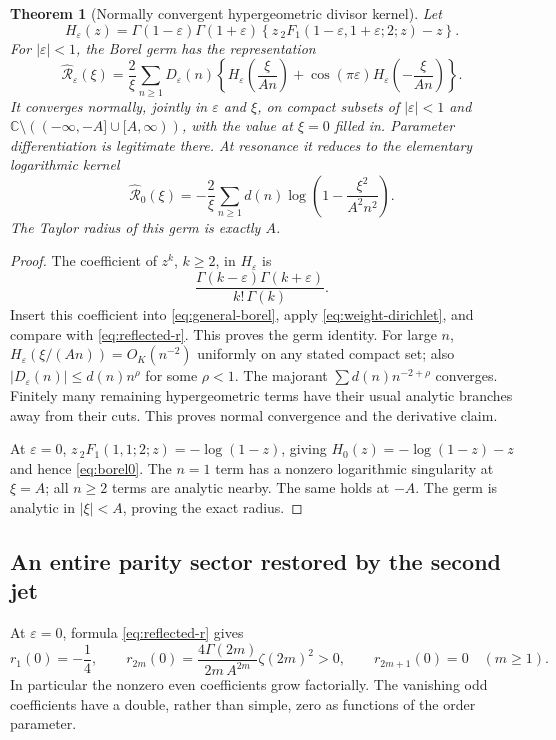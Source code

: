 \documentclass[11pt,a4paper]{article}
\numberwithin{equation}{section}
\newtheorem{theorem}{Theorem}[section]
\theoremstyle{definition}\newtheorem{definition}[theorem]{Definition}
\theoremstyle{remark}\newtheorem{remark}[theorem]{Remark}
\newcommand{\eps}{\varepsilon}
\newcommand{\C}{\mathbb C}\newcommand{\R}{\mathbb R}
\newcommand{\B}{\widehat{\mathcal R}}
\begin{document}
\begin{theorem}[Normally convergent hypergeometric divisor kernel]
\label{thm:hypergeometric-borel}
Let
\begin{equation}\label{eq:H}
 H_\eps(z)=\Gamma(1-\eps)\Gamma(1+\eps)
 \left\{z\,{}_2F_1(1-\eps,1+\eps;2;z)-z\right\}.
\end{equation}
For $|\eps|<1$, the Borel germ has the representation
\begin{equation}\label{eq:general-borel}
 \B_\eps(\xi)=\frac2\xi\sum_{n\ge1}D_\eps(n)
 \left\{H_\eps\left(\frac\xi{An}\right)
       +\cos(\pi\eps)H_\eps\left(-\frac\xi{An}\right)\right\}.
\end{equation}
It converges normally, jointly in $\eps$ and $\xi$, on compact
subsets of $|\eps|<1$ and
$\C\setminus(( -\infty,-A]\cup[A,\infty))$, with the value at
$\xi=0$ filled in. Parameter differentiation is legitimate there.
At resonance it reduces to the elementary logarithmic kernel
\begin{equation}\label{eq:borel0}
 \B_0(\xi)=-\frac2\xi\sum_{n\ge1}d(n)
             \log\left(1-\frac{\xi^2}{A^2n^2}\right).
\end{equation}
The Taylor radius of this germ is exactly $A$.
\end{theorem}
\begin{proof}
The coefficient of $z^k$, $k\ge2$, in $H_\eps$ is
\[
 \frac{\Gamma(k-\eps)\Gamma(k+\eps)}{k!\,\Gamma(k)}.
\]
Insert this coefficient into \eqref{eq:general-borel}, apply
\eqref{eq:weight-dirichlet}, and compare with
\eqref{eq:reflected-r}. This proves the germ identity. For large $n$,
$H_\eps(\xi/(An))=O_K(n^{-2})$ uniformly on any stated compact
set; also $|D_\eps(n)|\le d(n)n^\rho$ for some $\rho<1$.
The majorant $\sum d(n)n^{-2+\rho}$ converges. Finitely many
remaining hypergeometric terms have their usual analytic branches away
from their cuts. This proves normal convergence and the derivative claim.

At $\eps=0$,
$z\,{}_2F_1(1,1;2;z)=-\log(1-z)$, giving
$H_0(z)=-\log(1-z)-z$ and hence \eqref{eq:borel0}.
The $n=1$ term has a nonzero logarithmic singularity at $\xi=A$;
all $n\ge2$ terms are analytic nearby. The same holds at $-A$.
The germ is analytic in $|\xi|<A$, proving the exact radius.
\end{proof}

\subsection{An entire parity sector restored by the second jet}
At $\eps=0$, formula \eqref{eq:reflected-r} gives
\begin{equation}\label{eq:even-coefficients}
 r_1(0)=-\frac14,\qquad
 r_{2m}(0)=\frac{4\Gamma(2m)}{2m\,A^{2m}}\zeta(2m)^2>0,
 \qquad r_{2m+1}(0)=0\quad(m\ge1).
\end{equation}
In particular the nonzero even coefficients grow factorially. The
vanishing odd coefficients have a double, rather than simple, zero as
functions of the order parameter.
\end{document}

